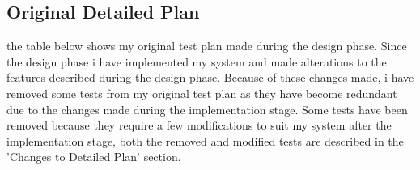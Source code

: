 \pagebreak

\subsection{Original Detailed Plan}

the table below shows my original test plan made during the design phase. Since the design phase i have implemented my system and made alterations to the features described during the design phase. Because of these changes made, i have removed some tests from my original test plan as they have become redundant due to the changes made during the implementation stage. Some tests have been removed because they require a few modifications to suit my system after the implementation stage, both the removed and modified tests are described in the 'Changes to Detailed Plan' section. 

